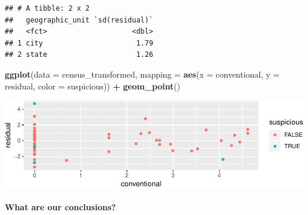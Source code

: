 \documentclass[landscape]{article}
\newenvironment{Shaded}{\begin{snugshade}}{\end{snugshade}}
\newcommand{\KeywordTok}[1]{\textcolor[rgb]{0.13,0.29,0.53}{\textbf{#1}}}
\newcommand{\DataTypeTok}[1]{\textcolor[rgb]{0.13,0.29,0.53}{#1}}
\newcommand{\StringTok}[1]{\textcolor[rgb]{0.31,0.60,0.02}{#1}}
\newcommand{\OperatorTok}[1]{\textcolor[rgb]{0.81,0.36,0.00}{\textbf{#1}}}
\newcommand{\NormalTok}[1]{#1}
\let\oldparagraph\paragraph
\renewcommand{\paragraph}[1]{\oldparagraph{#1}\mbox{}}
\begin{document}
\begin{Shaded}
\end{Shaded}

\begin{verbatim}
## # A tibble: 2 x 2
##   geographic_unit `sd(residual)`
##   <fct>                    <dbl>
## 1 city                      1.79
## 2 state                     1.26
\end{verbatim}

\begin{Shaded}
\begin{Highlighting}[]
\KeywordTok{ggplot}\NormalTok{(}\DataTypeTok{data =}\NormalTok{ census_transformed, }\DataTypeTok{mapping =} \KeywordTok{aes}\NormalTok{(}\DataTypeTok{x =}\NormalTok{ conventional, }\DataTypeTok{y =}\NormalTok{ residual, }\DataTypeTok{color =}\NormalTok{ suspicious)) }\OperatorTok{+}
\StringTok{  }\KeywordTok{geom_point}\NormalTok{()}
\end{Highlighting}
\end{Shaded}

\includegraphics{20190422_multicollinearity_files/figure-latex/unnamed-chunk-22-5.pdf}

\newpage

\paragraph{What are our conclusions?}\label{what-are-our-conclusions}
\end{document}
